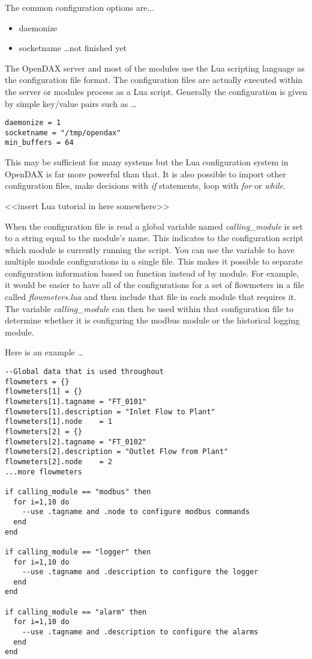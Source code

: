 The common configuration options are...

\begin{itemize}
\item daemonize
\item socketname
\ldots not finished yet
\end{itemize}

The OpenDAX server and most of the modules use the Lua scripting language as the configuration file format.  The configuration files are actually executed within the server or modules process as a Lua script.  Generally the configuration is given by simple key/value pairs such as \ldots

\begin{verbatim}
daemonize = 1
socketname = "/tmp/opendax"
min_buffers = 64
\end{verbatim}

This may be sufficient for many systems but the Lua configuration system in OpenDAX is far more powerful than that.  It is also possible to import other configuration files, make decisions with \emph{if} statements, loop with \emph{for} or \emph{while}.

<<insert Lua tutorial in here somewhere>>

When the configuration file is read a global variable named \emph{calling\_module} is set to a string equal to the module's name.  This indicates to the configuration script which module is currently running the script.  You can use the variable to have multiple module configurations in a single file.  This makes it possible to separate configuration information based on function instead of by module.  For example, it would be easier to have all of the configurations for a set of flowmeters in a file called \emph{flowmeters.lua} and then include that file in each module that requires it.  The variable \emph{calling\_module} can then be used within that configuration file to determine whether it is configuring the modbus module or the historical logging module.

Here is an example \ldots

\begin{verbatim}
--Global data that is used throughout
flowmeters = {}
flowmeters[1] = {}
flowmeters[1].tagname = "FT_0101"
flowmeters[1].description = "Inlet Flow to Plant"
flowmeters[1].node    = 1
flowmeters[2] = {}
flowmeters[2].tagname = "FT_0102"
flowmeters[2].description = "Outlet Flow from Plant"
flowmeters[2].node    = 2
...more flowmeters

if calling_module == "modbus" then
  for i=1,10 do
    --use .tagname and .node to configure modbus commands
  end
end

if calling_module == "logger" then
  for i=1,10 do
    --use .tagname and .description to configure the logger
  end
end

if calling_module == "alarm" then
  for i=1,10 do
    --use .tagname and .description to configure the alarms
  end
end
\end{verbatim}

